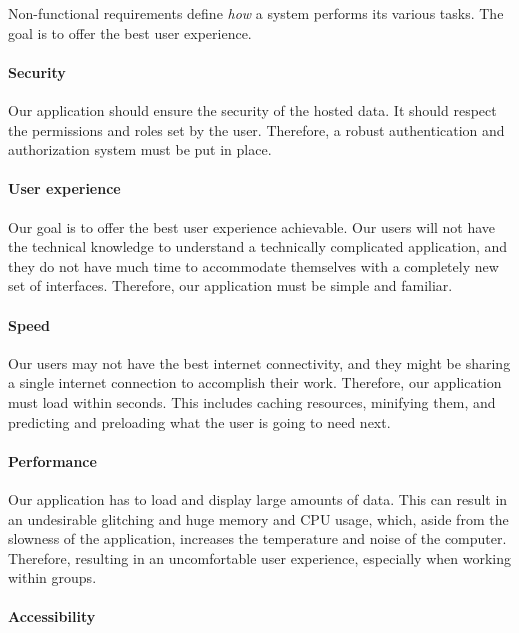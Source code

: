 Non-functional requirements define \textit{how} a system performs its various tasks.
The goal is to offer the best user experience.

\paragraph{Security}

Our application should ensure the security of the hosted data.
It should respect the permissions and roles set by the user.
Therefore, a robust authentication and authorization system must be put in place.

\paragraph{User experience}

Our goal is to offer the best user experience achievable.
Our users will not have the technical knowledge to understand a technically complicated application, and they do not have much time to accommodate themselves with a completely new set of interfaces.
Therefore, our application must be simple and familiar.

\paragraph{Speed}

Our users may not have the best internet connectivity, and they might be sharing a single internet connection to accomplish their work.
Therefore, our application must load within seconds.
This includes caching resources, minifying them, and predicting and preloading what the user is going to need next.

\paragraph{Performance}

Our application has to load and display large amounts of data.
This can result in an undesirable glitching and huge memory and CPU usage, which, aside from the slowness of the application, increases the temperature and noise of the computer.
Therefore, resulting in an uncomfortable user experience, especially when working within groups.

\paragraph{Accessibility}

